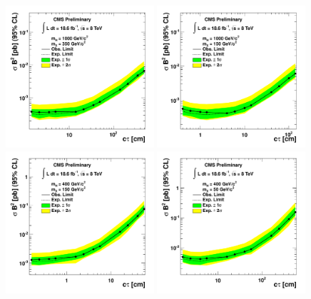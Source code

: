 \begin{figure}[htbp]
\centering
\includegraphics[width=0.49\textwidth]{plots/limits/1000_350e.pdf}
\includegraphics[width=0.49\textwidth]{plots/limits/1000_150e.pdf} 
\includegraphics[width=0.49\textwidth]{plots/limits/400_150e.pdf}
\includegraphics[width=0.49\textwidth]{plots/limits/400_50e.pdf} 

\end{figure}
